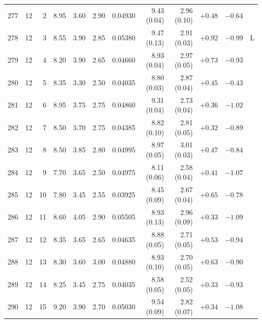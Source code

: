 \begin{longtable}{@{}rrrrrrrrrrrr@{}}
277 & 12 & 2 & \num{8.95} & \num{3.60} & \num{2.90} & \num{0.04930} & \num{9.43} (\num{0.04}) & \num{2.96} (\num{0.10}) & $+\num{0.48}$ & $-\num{0.64}$ &  \\
278 & 12 & 3 & \num{8.55} & \num{3.90} & \num{2.85} & \num{0.05380} & \num{9.47} (\num{0.13}) & \num{2.91} (\num{0.03}) & $+\num{0.92}$ & $-\num{0.99}$ & L \\
279 & 12 & 4 & \num{8.20} & \num{3.90} & \num{2.65} & \num{0.04660} & \num{8.93} (\num{0.04}) & \num{2.97} (\num{0.05}) & $+\num{0.73}$ & $-\num{0.93}$ &  \\
280 & 12 & 5 & \num{8.35} & \num{3.30} & \num{2.50} & \num{0.04035} & \num{8.80} (\num{0.03}) & \num{2.87} (\num{0.04}) & $+\num{0.45}$ & $-\num{0.43}$ &  \\
281 & 12 & 6 & \num{8.95} & \num{3.75} & \num{2.75} & \num{0.04860} & \num{9.31} (\num{0.04}) & \num{2.73} (\num{0.04}) & $+\num{0.36}$ & $-\num{1.02}$ &  \\
282 & 12 & 7 & \num{8.50} & \num{3.70} & \num{2.75} & \num{0.04385} & \num{8.82} (\num{0.10}) & \num{2.81} (\num{0.05}) & $+\num{0.32}$ & $-\num{0.89}$ &  \\
283 & 12 & 8 & \num{8.50} & \num{3.85} & \num{2.80} & \num{0.04995} & \num{8.97} (\num{0.05}) & \num{3.01} (\num{0.03}) & $+\num{0.47}$ & $-\num{0.84}$ &  \\
284 & 12 & 9 & \num{7.70} & \num{3.65} & \num{2.50} & \num{0.04975} & \num{8.11} (\num{0.06}) & \num{2.58} (\num{0.04}) & $+\num{0.41}$ & $-\num{1.07}$ &  \\
285 & 12 & 10 & \num{7.80} & \num{3.45} & \num{2.55} & \num{0.03925} & \num{8.45} (\num{0.09}) & \num{2.67} (\num{0.04}) & $+\num{0.65}$ & $-\num{0.78}$ &  \\
286 & 12 & 11 & \num{8.60} & \num{4.05} & \num{2.90} & \num{0.05505} & \num{8.93} (\num{0.13}) & \num{2.96} (\num{0.09}) & $+\num{0.33}$ & $-\num{1.09}$ &  \\
287 & 12 & 12 & \num{8.35} & \num{3.65} & \num{2.65} & \num{0.04635} & \num{8.88} (\num{0.05}) & \num{2.71} (\num{0.05}) & $+\num{0.53}$ & $-\num{0.94}$ &  \\
288 & 12 & 13 & \num{8.30} & \num{3.60} & \num{3.00} & \num{0.04880} & \num{8.93} (\num{0.10}) & \num{2.70} (\num{0.05}) & $+\num{0.63}$ & $-\num{0.90}$ &  \\
289 & 12 & 14 & \num{8.25} & \num{3.45} & \num{2.75} & \num{0.04035} & \num{8.58} (\num{0.05}) & \num{2.52} (\num{0.05}) & $+\num{0.33}$ & $-\num{0.93}$ &  \\
290 & 12 & 15 & \num{9.20} & \num{3.90} & \num{2.70} & \num{0.05030} & \num{9.54} (\num{0.09}) & \num{2.82} (\num{0.07}) & $+\num{0.34}$ & $-\num{1.08}$ &  \\

\end{longtable}
